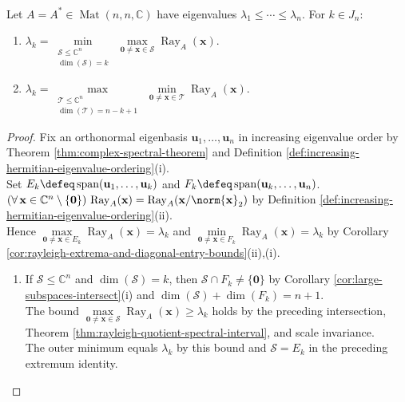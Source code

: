 \begin{theorem} \label{thm:courant-fischer-rayleigh-minmax} \\
Let $A=A^*\in\operatorname{Mat}(n,n,\mathbb{C})$ have eigenvalues $\lambda_1\leq\cdots\leq\lambda_n$. For $k\in J_n$:
\begin{enumerate}[label=(\roman*)]
\setlength{\itemsep}{0pt}
\item $\lambda_k=\min\limits_{\substack{\mathcal{S}\leq\mathbb{C}^n\\ \dim(\mathcal{S})=k}}\ \max\limits_{\mathbf{0}\neq\mathbf{x}\in\mathcal{S}}\operatorname{Ray}_A(\mathbf{x})$.
\item $\lambda_k=\max\limits_{\substack{\mathcal{T}\leq\mathbb{C}^n\\ \dim(\mathcal{T})=n-k+1}}\ \min\limits_{\mathbf{0}\neq\mathbf{x}\in\mathcal{T}}\operatorname{Ray}_A(\mathbf{x})$.
\end{enumerate}
\begin{proof}
Fix an orthonormal eigenbasis $\mathbf{u}_1,\ldots,\mathbf{u}_n$ in increasing eigenvalue order by Theorem \ref{thm:complex-spectral-theorem} and Definition \ref{def:increasing-hermitian-eigenvalue-ordering}(i).\\
Set $E_k\defeq\operatorname{span}(\mathbf{u}_1,\ldots,\mathbf{u}_k)$ and $F_k\defeq\operatorname{span}(\mathbf{u}_k,\ldots,\mathbf{u}_n)$. $(\forall\,\mathbf{x}\in\mathbb{C}^n\setminus\{\mathbf{0}\})\,\operatorname{Ray}_A(\mathbf{x})=\operatorname{Ray}_A(\mathbf{x}/\norm{\mathbf{x}}_2)$ by Definition \ref{def:increasing-hermitian-eigenvalue-ordering}(ii).\\
Hence $\max\limits_{\mathbf{0}\neq\mathbf{x}\in E_k}\operatorname{Ray}_A(\mathbf{x})=\lambda_k$ and $\min\limits_{\mathbf{0}\neq\mathbf{x}\in F_k}\operatorname{Ray}_A(\mathbf{x})=\lambda_k$ by Corollary \ref{cor:rayleigh-extrema-and-diagonal-entry-bounds}(ii),(i).
\begin{enumerate}[label=(\roman*)]
\setlength{\itemsep}{0pt}
\item If $\mathcal{S}\leq\mathbb{C}^n$ and $\dim(\mathcal{S})=k$, then $\mathcal{S}\cap F_k\neq\{\mathbf{0}\}$ by Corollary \ref{cor:large-subspaces-intersect}(i) and $\dim(\mathcal{S})+\dim(F_k)=n+1$.\\
The bound $\max\limits_{\mathbf{0}\neq\mathbf{x}\in\mathcal{S}}\operatorname{Ray}_A(\mathbf{x})\geq\lambda_k$ holds by the preceding intersection, Theorem \ref{thm:rayleigh-quotient-spectral-interval}, and scale invariance.\\
The outer minimum equals $\lambda_k$ by this bound and $\mathcal{S}=E_k$ in the preceding extremum identity.

\end{enumerate}
\end{proof}
\end{theorem}
